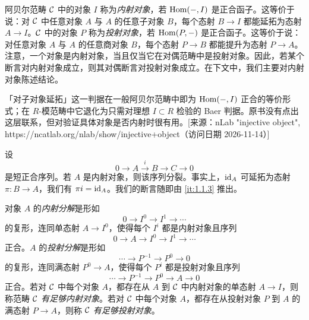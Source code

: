 阿贝尔范畴 $\mathcal{C}$ 中的对象 $I$ 称为\emph{内射对象}，若 $\operatorname{Hom}(-,I)$ 是正合函子。这等价于说：对 $\mathcal{C}$ 中任意对象 $A$ 与 $A$ 的任意子对象 $B$，每个态射 $B\to I$ 都能延拓为态射 $A\to I$。$\mathcal{C}$ 中的对象 $P$ 称为\emph{投射对象}，若 $\operatorname{Hom}(P,-)$ 是正合函子。这等价于说：对任意对象 $A$ 与 $A$ 的任意商对象 $B$，每个态射 $P\to B$ 都能提升为态射 $P\to A$。注意，一个对象是内射对象，当且仅当它在对偶范畴中是投射对象。因此，若某个断言对内射对象成立，则其对偶断言对投射对象成立。在下文中，我们主要对内射对象陈述结论。
\begin{tnote}
「对子对象延拓」这一判据在一般阿贝尔范畴中即为 $\operatorname{Hom}(-,I)$ 正合的等价形式；在 $R$-模范畴中它退化为只需对理想 $I\subset R$ 检验的 Baer 判据。原书没有点出这层联系，但对验证具体对象是否内射时很有用。[来源：nLab "injective object", https://ncatlab.org/nlab/show/injective+object（访问日期 2026-11-14）]
\end{tnote}

设
\[
0\to A\xrightarrow{i}B\to C\to 0
\]
是短正合序列。若 $A$ 是内射对象，则该序列分裂。事实上，$\operatorname{id}_A$ 可延拓为态射 $\pi\colon B\to A$，我们有 $\pi i=\operatorname{id}_A$。我们的断言随即由 \ref{it:1.1.3} 推出。

对象 $A$ 的\emph{内射分解}是形如
\[
0\to I^0\to I^1\to\cdots
\]
的复形，连同单态射 $A\to I^0$，使得每个 $I^i$ 都是内射对象且序列
\[
0\to A\to I^0\to I^1\to\cdots
\]
正合。$A$ 的\emph{投射分解}是形如
\[
\cdots\to P^{-1}\to P^0\to 0
\]
的复形，连同满态射 $P^0\to A$，使得每个 $P^i$ 都是投射对象且序列
\[
\cdots\to P^{-1}\to P^0\to A\to 0
\]
正合。若对 $\mathcal{C}$ 中每个对象 $A$，都存在从 $A$ 到 $\mathcal{C}$ 中内射对象的单态射 $A\to I$，则称范畴 $\mathcal{C}$ \emph{有足够内射对象}。若对 $\mathcal{C}$ 中每个对象 $A$，都存在从投射对象 $P$ 到 $A$ 的满态射 $P\to A$，则称 $\mathcal{C}$ \emph{有足够投射对象}。


